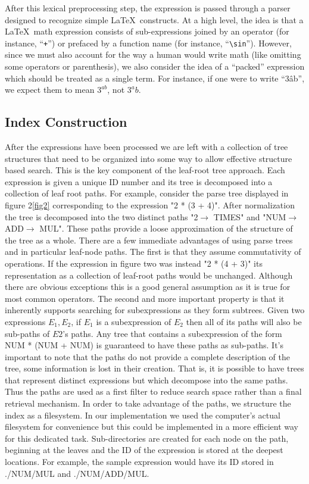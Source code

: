 \documentclass{sig-alternate}
\begin{document}
After this lexical preprocessing step, the expression is passed through a parser designed to recognize simple \LaTeX\, constructs.  At a high level, the idea is that a \LaTeX\, math expression consists of sub-expressions joined by an operator (for instance, ``\texttt{+}'') or prefaced by a function name (for instance, ``\texttt{\textbackslash sin}'').  However, since we must also account for the way a human would write math (like omitting some operators or parenthesis), we also consider the idea of a ``packed'' expression which should be treated as a single term.  For instance, if one were to write ``3\^ab'', we expect them to mean $3^{ab}$, not $3^ab$. 

\subsection{Index Construction}
After the expressions have been processed we are left with a collection of tree structures that need to be organized into some way to allow effective structure based search. This is the key component of the leaf-root tree approach. Each expression is given a unique ID number and its tree is decomposed into a collection of leaf root paths. For example, consider the parse tree displayed in figure 2\ref{fig2} corresponding to the expression "2 * (3 + 4)". After normalization the tree is decomposed into the two distinct paths "2$\rightarrow$ TIMES" and "NUM$\rightarrow$ ADD$\rightarrow$ MUL". These paths provide a loose approximation of the structure of the tree as a whole. 
There are a few immediate advantages of using parse trees and in particular leaf-node paths. The first is that they assume commutativity of operations. If the expression in figure two was instead "2 * (4 + 3)" its representation as a collection of leaf-root paths would be unchanged. Although there are obvious exceptions this is a good general assumption as it is true for most common operators.
The second and more important property is that it inherently supports searching for subexpressions as they
form subtrees. Given two expressions $E_1, E_2$, if $E_1$ is a subexpression of $E_2$ then all of its
paths will also be sub-paths of $E2$'s paths. Any tree that contains a subexpression of the form NUM * (NUM + NUM) is guaranteed to have these paths as sub-paths. 
It's important to note that the paths do not provide a complete description of the tree, some information is lost in their creation. That is, it is possible to have trees that represent distinct expressions but which decompose into the same paths. Thus the paths are used as a first filter to reduce search space rather than a final retrieval mechanism. In order to take advantage of the paths, we structure the index as a filesystem. In our implementation we used the computer's actual filesystem for convenience but this could be implemented in a more efficient way for this dedicated task. Sub-directories are created for each node on the path, beginning at the leaves and the ID of the expression is stored at the deepest locations. For example, the sample expression would have its ID stored in ./NUM/MUL and ./NUM/ADD/MUL. 
\end{document}
